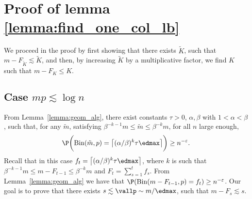 \section{Proof of lemma \ref{lemma:find_one_col_lb}} \label{sec:appendix_proof_lemma_8}
%
We proceed in the proof by first showing that there exists \(\tilde K\), such that \(m - F_{\tilde K} \lesssim \tilde K\), and then, by increasing \(\tilde K\) by a multiplicative factor, we find \(K\) such that \(m - F_K \leq K\).
\subsection*{Case \(mp \lesssim \log n\)} 
From Lemma~\ref{lemma:geom_alg}, there exist constants \(\tau > 0\), \(\alpha, \beta\) with \(1 < \alpha < \beta\), such that, for any \(\tilde m\), satisfying \(\beta^{-k-1}m \leq \tilde m \leq \beta^{-k} m\), for all \(n\) large enough,
    \begin{equation*}
        \P\biggl(\mathrm{Bin}(\tilde m, p) = \bigl\lceil (\alpha / \beta)^{k} \tau \edmax\bigr\rceil \biggr) \geq n^{-\varepsilon}.
    \end{equation*}
Recall that in this case \(f_t  = \bigl\lceil (\alpha / \beta)^{k} \tau \edmax\bigr\rceil\), where \(k\) is such that \(\beta^{-k-1}m \leq m - F_{t-1} \leq \beta^{-k} m\) and \(F_t = \sum_{s = 1}^t f_s\). From Lemma~\ref{lemma:geom_alg} we have that \(\P(\mathrm{Bin}(m - F_{t-1}, p) = f_t) \geq n^{-\varepsilon}\). Our goal is to prove that there exists \(s \lesssim \vallp \sim m / \edmax\), such that \(m - F_s \lesssim s\). 

